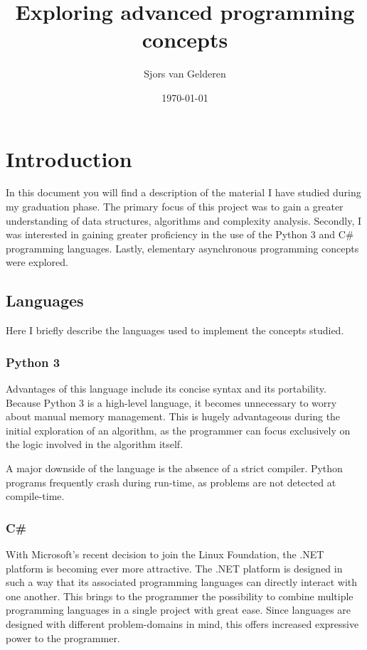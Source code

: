 \documentclass{article}
\author{Sjors van Gelderen}
\title{Exploring advanced programming concepts}
\date{\today{}}
\begin{document}
\maketitle{}

\newpage

\tableofcontents{}

\newpage

\section{Introduction}
In this document you will find a description of the material I have studied during my graduation phase.
The primary focus of this project was to gain a greater understanding of data structures, algorithms and complexity analysis.
Secondly, I was interested in gaining greater proficiency in the use of the Python 3 and C\# programming languages.
Lastly, elementary asynchronous programming concepts were explored.

\subsection{Languages}
Here I briefly describe the languages used to implement the concepts studied.

\subsubsection{Python 3}
Advantages of this language include its concise syntax and its portability.
Because Python 3 is a high-level language, it becomes unnecessary to worry about manual memory management.
This is hugely advantageous during the initial exploration of an algorithm, as the programmer can focus exclusively on
the logic involved in the algorithm itself.

A major downside of the language is the absence of a strict compiler.
Python programs frequently crash during run-time, as problems are not detected at compile-time.

\subsubsection{C\#}
With Microsoft's recent decision to join the Linux Foundation, the .NET platform is becoming ever more attractive.
The .NET platform is designed in such a way that its associated programming languages can directly interact with one another.
This brings to the programmer the possibility to combine multiple programming languages in a single project with great ease.
Since languages are designed with different problem-domains in mind, this offers increased expressive power to the programmer.
\end{document}
